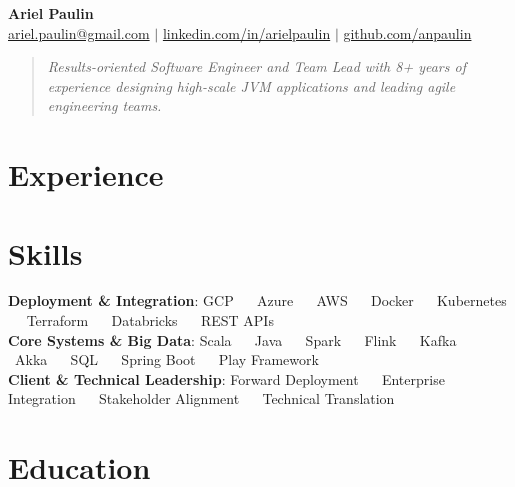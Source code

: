 \documentclass[letterpaper,11pt]{article}
\newcommand{\resumeSubHeadingListStart}{\begin{itemize}[leftmargin=0.15in, label={}]}
\newcommand{\resumeSubHeadingListEnd}{\end{itemize}}
\begin{document}
\begin{center}
    \textbf{\Huge Ariel Paulin} \\ \vspace{2pt}
    \small{
    \href{mailto:ariel.paulin@gmail.com}{ariel.paulin@gmail.com} $|$ 
    \href{https://www.linkedin.com/in/arielpaulin}{linkedin.com/in/arielpaulin} $|$
    \href{https://github.com/anpaulin}{github.com/anpaulin}
    }
    \vspace{2pt}
\end{center}
\begin{quote}
    \vspace{2pt}
    \small\textit{Results-oriented Software Engineer and Team Lead with 8+ years of experience designing high-scale JVM applications and leading agile engineering teams.}
    \vspace{-5pt}
\end{quote}

\section{Experience}
  \resumeSubHeadingListStart
    
    
    
    
    
  \resumeSubHeadingListEnd

\section{Skills}
\begin{itemize}[leftmargin=0.15in, label={}]
  \small{\item{
    \textbf{Deployment \& Integration}: \quad GCP \ \textbf{\textbar} \ Azure \ \textbf{\textbar} \ AWS \ \textbf{\textbar} \ Docker \ \textbf{\textbar} \ Kubernetes \ \textbf{\textbar} \ Terraform \ \textbf{\textbar} \ Databricks \ \textbf{\textbar} \ REST APIs \\
    \textbf{Core Systems \& Big Data}: \quad Scala \ \textbf{\textbar} \ Java \ \textbf{\textbar} \ Spark \ \textbf{\textbar} \ Flink \ \textbf{\textbar} \ Kafka \ \textbf{\textbar} \ Akka \ \textbf{\textbar} \ SQL \ \textbf{\textbar} \ Spring Boot \ \textbf{\textbar} \ Play Framework \\
    \textbf{Client \& Technical Leadership}: \quad Forward Deployment \ \textbf{\textbar} \ Enterprise Integration \ \textbf{\textbar} \ Stakeholder Alignment \ \textbf{\textbar} \ Technical Translation
  }}
\end{itemize}

\section{Education}
  \resumeSubHeadingListStart
    
  \resumeSubHeadingListEnd

\end{document}
